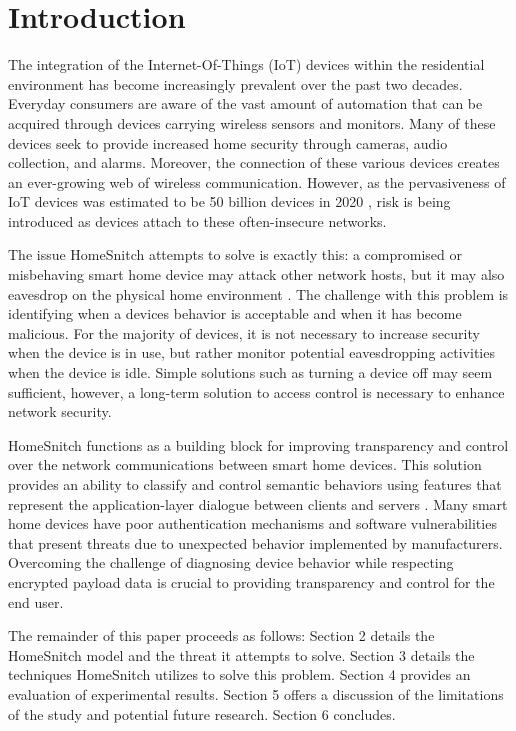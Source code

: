 \section{Introduction}
\label{sec:intro}
The integration of the Internet-Of-Things (IoT) devices within the residential environment has become increasingly prevalent over the past two decades. Everyday consumers are aware of the vast amount of automation that can be acquired through devices carrying wireless sensors and monitors. Many of these devices seek to provide increased home security through cameras, audio collection,  and alarms. Moreover, the connection of these various devices creates an ever-growing web of wireless communication. However, as the pervasiveness of IoT devices was estimated to be 50 billion devices in 2020 \cite{Helen}, risk is being introduced as devices attach to these often-insecure networks. 
    
The issue HomeSnitch attempts to solve is exactly this: a compromised or misbehaving smart home device may attack other network hosts, but it may also eavesdrop on the physical home environment \cite{Enck}. The challenge with this problem is identifying when a devices behavior is acceptable and when it has become malicious. For the majority of devices, it is not necessary to increase security when the device is in use, but rather monitor potential eavesdropping activities when the device is idle. Simple solutions such as turning a device off may seem sufficient, however, a long-term solution to access control is necessary to enhance network security. 

HomeSnitch functions as a building block for improving transparency and control over the network communications between smart home devices. This solution provides an ability to classify and control semantic behaviors using features that represent the application-layer dialogue between clients and servers \cite{Enck}. Many smart home devices have poor authentication mechanisms and software vulnerabilities that present threats due to unexpected behavior implemented by manufacturers. Overcoming the challenge of diagnosing device behavior while respecting encrypted payload data is crucial to providing transparency and control for the end user.  

The remainder of this paper proceeds as follows: Section 2 details the HomeSnitch model and the threat it attempts to solve. Section 3 details the techniques HomeSnitch utilizes to solve this problem. Section 4 provides an evaluation of experimental results. Section 5 offers a discussion of the limitations of the study and potential future research. Section 6 concludes. 